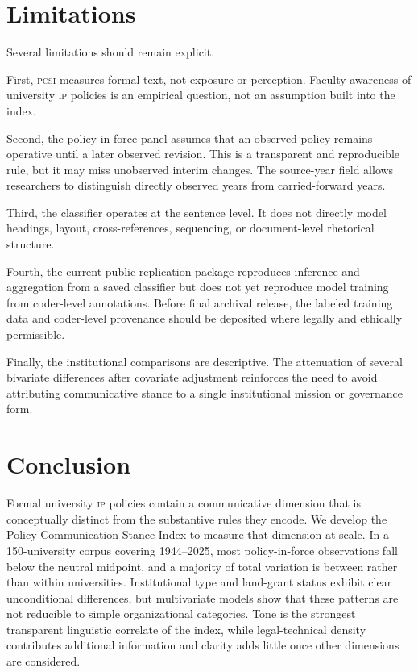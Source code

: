 \documentclass[12pt]{article}
\newcommand{\PCSI}{\textsc{pcsi}}
\newcommand{\IP}{\textsc{ip}}
\begin{document}
\section{Limitations}

Several limitations should remain explicit.

First, \PCSI{} measures formal text, not exposure or perception. Faculty awareness of university \IP{} policies is an empirical question, not an assumption built into the index.

Second, the policy-in-force panel assumes that an observed policy remains operative until a later observed revision. This is a transparent and reproducible rule, but it may miss unobserved interim changes. The source-year field allows researchers to distinguish directly observed years from carried-forward years.

Third, the classifier operates at the sentence level. It does not directly model headings, layout, cross-references, sequencing, or document-level rhetorical structure.

Fourth, the current public replication package reproduces inference and aggregation from a saved classifier but does not yet reproduce model training from coder-level annotations. Before final archival release, the labeled training data and coder-level provenance should be deposited where legally and ethically permissible.

Finally, the institutional comparisons are descriptive. The attenuation of several bivariate differences after covariate adjustment reinforces the need to avoid attributing communicative stance to a single institutional mission or governance form.

\section{Conclusion}

Formal university \IP{} policies contain a communicative dimension that is conceptually distinct from the substantive rules they encode. We develop the Policy Communication Stance Index to measure that dimension at scale. In a 150-university corpus covering 1944--2025, most policy-in-force observations fall below the neutral midpoint, and a majority of total variation is between rather than within universities. Institutional type and land-grant status exhibit clear unconditional differences, but multivariate models show that these patterns are not reducible to simple organizational categories. Tone is the strongest transparent linguistic correlate of the index, while legal-technical density contributes additional information and clarity adds little once other dimensions are considered.
\end{document}
